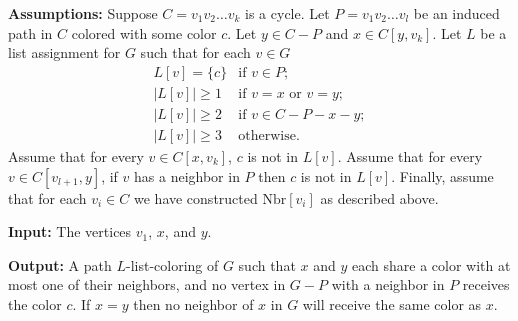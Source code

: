 \documentclass[letterpaper, 12pt]{article}
\theoremstyle{thm}
\begin{document}
\noindent\textbf{Assumptions:} Suppose $C=v_1v_2\ldots v_k$ is a cycle. Let
$P=v_1v_2\ldots v_l$ be an induced path in $C$ colored with some color $c$. Let
$y\in C-P$ and $x\in C[y,v_k]$. Let $L$ be a list assignment for $G$ such that
for each $v\in G$
\[
    \begin{array}{ll}
        L[v]=\{c\} & \text{if } v\in P;\\
	    \big|L[v]\big|\ge 1 & \text{if } v=x \text{ or } v=y;\\
	    \big|L[v]\big|\ge 2 & \text{if } v\in C-P-x-y;\\
	    \big|L[v]\big|\ge 3 & \text{otherwise.}
    \end{array}
\]
Assume that for every $v\in C[x,v_k]$, $c$ is not in $L[v]$. Assume that for
every $v\in C[v_{l+1},y]$, if $v$ has a neighbor in $P$ then $c$ is not in $L[v]$.
Finally, assume that for each $v_i\in C$ we have constructed
$\text{Nbr}[v_i]$ as described above.

\noindent\textbf{Input:} The vertices $v_1$, $x$, and $y$.

\noindent\textbf{Output:} A path $L$-list-coloring of $G$ such that $x$ and
$y$ each share a color with at most one of their neighbors, and no vertex in
$G-P$ with a neighbor in $P$ receives the color $c$. If $x=y$ then no neighbor
of $x$ in $G$ will receive the same color as $x$.

\begin{comment}
\begin{figure}
\begin{center}
\begin{tikzpicture}
  \node (c_n) [label=above left:$v_k$, fill] at (-1.5cm, 1.25cm) {};
  \node (p) [label=above:{$v_1$}] at (0cm, 2cm) {};
  \node (p_label) [draw=none, scale=0.8] at (0cm, 2cm) {};
  \node (c_1) [label=above:$v_2$] at (1.5cm, 1.25cm) {};
  \node (c_i) [label=below:$u$] at (0cm, -1cm) {};
  \node (G_0) [draw=none, fill=none] at (-0.75cm, 0.12cm) {$C_1$};
  \node (G_1) [draw=none, fill=none] at (0.7cm, 0.5cm) {$C_2$};
  
  \draw (c_i) edge [bend left] (c_n) [dashed];
  \draw (c_n) edge [bend left] (c_i) [dashed];
  \draw (c_n) edge (p);
  \draw (p) edge (c_1);
  \draw (p) edge (c_i);
  \draw (c_1) edge [bend left] (c_i) [dashed];
\end{tikzpicture}
\end{center}

\caption{The cycles $C_1$ and $C_2$.}
\end{figure}
\end{comment}
\end{document}
